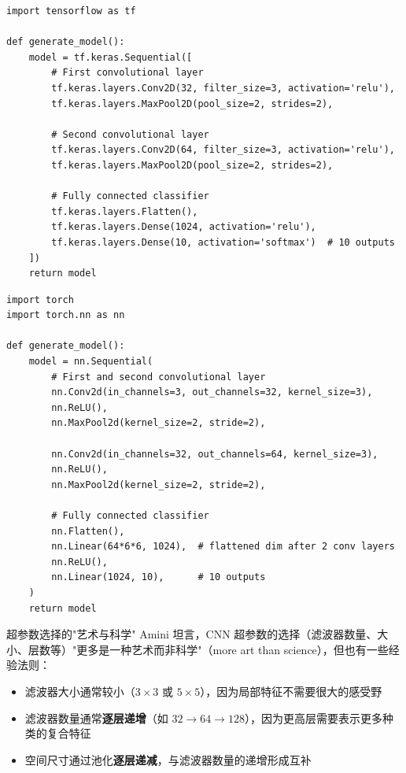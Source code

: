 \documentclass[a4paper]{article}
\begin{document}
\begin{lstlisting}[caption={TensorFlow/Keras CNN 实现}]
import tensorflow as tf

def generate_model():
    model = tf.keras.Sequential([
        # First convolutional layer
        tf.keras.layers.Conv2D(32, filter_size=3, activation='relu'),
        tf.keras.layers.MaxPool2D(pool_size=2, strides=2),

        # Second convolutional layer
        tf.keras.layers.Conv2D(64, filter_size=3, activation='relu'),
        tf.keras.layers.MaxPool2D(pool_size=2, strides=2),

        # Fully connected classifier
        tf.keras.layers.Flatten(),
        tf.keras.layers.Dense(1024, activation='relu'),
        tf.keras.layers.Dense(10, activation='softmax')  # 10 outputs
    ])
    return model
\end{lstlisting}

\begin{lstlisting}[caption={PyTorch CNN 实现}]
import torch
import torch.nn as nn

def generate_model():
    model = nn.Sequential(
        # First and second convolutional layer
        nn.Conv2d(in_channels=3, out_channels=32, kernel_size=3),
        nn.ReLU(),
        nn.MaxPool2d(kernel_size=2, stride=2),

        nn.Conv2d(in_channels=32, out_channels=64, kernel_size=3),
        nn.ReLU(),
        nn.MaxPool2d(kernel_size=2, stride=2),

        # Fully connected classifier
        nn.Flatten(),
        nn.Linear(64*6*6, 1024),  # flattened dim after 2 conv layers
        nn.ReLU(),
        nn.Linear(1024, 10),      # 10 outputs
    )
    return model
\end{lstlisting}

\begin{knowledgebox}{超参数选择的"艺术与科学"}
Amini 坦言，CNN 超参数的选择（滤波器数量、大小、层数等）"更多是一种艺术而非科学"（more art than science），但也有一些经验法则：
\begin{itemize}
    \item 滤波器大小通常较小（$3 \times 3$ 或 $5 \times 5$），因为局部特征不需要很大的感受野
    \item 滤波器数量通常\textbf{逐层递增}（如 $32 \rightarrow 64 \rightarrow 128$），因为更高层需要表示更多种类的复合特征
    \item 空间尺寸通过池化\textbf{逐层递减}，与滤波器数量的递增形成互补
\end{itemize}
\end{knowledgebox}
\end{document}
